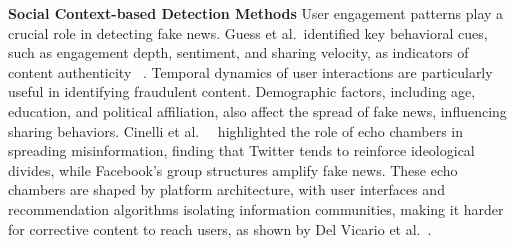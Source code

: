 \documentclass[runningheads]{llncs}
\begin{document}
\vspace{0.25\baselineskip}
\noindent \textbf{Social Context-based Detection Methods}
User engagement patterns play a crucial role in detecting fake news. Guess et al.~identified key behavioral cues, such as engagement depth, sentiment, and sharing velocity, as indicators of content authenticity ~\cite{cinelli2021echo}. Temporal dynamics of user interactions are particularly useful in identifying fraudulent content.
Demographic factors, including age, education, and political affiliation, also affect the spread of fake news, influencing sharing behaviors. Cinelli et al.~~\cite{cinelli2021echo}  highlighted the role of echo chambers in spreading misinformation, finding that Twitter tends to reinforce ideological divides, while Facebook’s group structures amplify fake news. These echo chambers are shaped by platform architecture, with user interfaces and recommendation algorithms isolating information communities, making it harder for corrective content to reach users, as shown by Del Vicario et al.~\cite{delvicario2019misinformation}.
%
%
\end{document}
